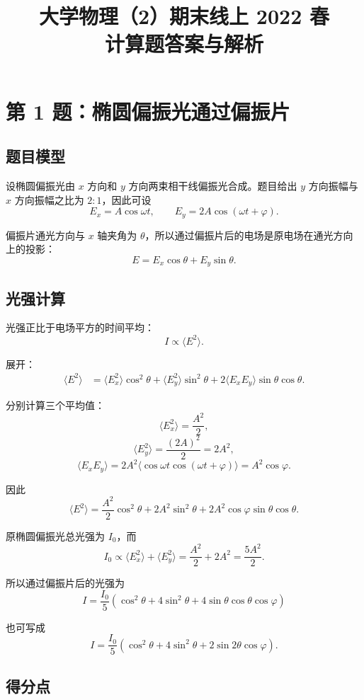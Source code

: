 \documentclass[12pt,a4paper]{ctexart}
\title{大学物理（2）期末线上 2022 春\\计算题答案与解析}
\author{}
\date{}
\begin{document}
\maketitle

\section*{第 1 题：椭圆偏振光通过偏振片}

\subsection*{题目模型}

设椭圆偏振光由 $x$ 方向和 $y$ 方向两束相干线偏振光合成。题目给出 $y$ 方向振幅与 $x$ 方向振幅之比为 $2:1$，因此可设
\[
E_x=A\cos\omega t,\qquad
E_y=2A\cos(\omega t+\varphi).
\]

偏振片通光方向与 $x$ 轴夹角为 $\theta$，所以通过偏振片后的电场是原电场在通光方向上的投影：
\[
E=E_x\cos\theta+E_y\sin\theta.
\]

\subsection*{光强计算}

光强正比于电场平方的时间平均：
\[
I\propto \langle E^2\rangle.
\]

展开：
\[
\begin{aligned}
\langle E^2\rangle
&=\langle E_x^2\rangle\cos^2\theta
 +\langle E_y^2\rangle\sin^2\theta
 +2\langle E_xE_y\rangle\sin\theta\cos\theta.
\end{aligned}
\]

分别计算三个平均值：
\[
\langle E_x^2\rangle=\frac{A^2}{2},
\]
\[
\langle E_y^2\rangle=\frac{(2A)^2}{2}=2A^2,
\]
\[
\langle E_xE_y\rangle
=2A^2\langle \cos\omega t\cos(\omega t+\varphi)\rangle
=A^2\cos\varphi.
\]

因此
\[
\langle E^2\rangle
=\frac{A^2}{2}\cos^2\theta
+2A^2\sin^2\theta
+2A^2\cos\varphi\sin\theta\cos\theta.
\]

原椭圆偏振光总光强为 $I_0$，而
\[
I_0\propto \langle E_x^2\rangle+\langle E_y^2\rangle
=\frac{A^2}{2}+2A^2
=\frac{5A^2}{2}.
\]

所以通过偏振片后的光强为
\[
\boxed{
I=\frac{I_0}{5}
\left(
\cos^2\theta+4\sin^2\theta+4\sin\theta\cos\theta\cos\varphi
\right)
}
\]

也可写成
\[
\boxed{
I=\frac{I_0}{5}
\left(
\cos^2\theta+4\sin^2\theta+2\sin2\theta\cos\varphi
\right)
}.
\]

\subsection*{得分点}
\end{document}
